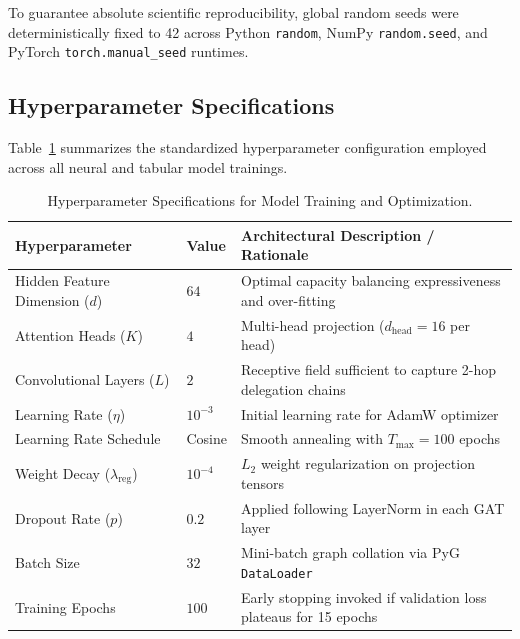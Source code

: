 To guarantee absolute scientific reproducibility, global random seeds were deterministically fixed to 42 across Python \texttt{random}, NumPy \texttt{random.seed}, and PyTorch \texttt{torch.manual\_seed} runtimes.

\subsection{Hyperparameter Specifications}
Table~\ref{tab:hyperparams} summarizes the standardized hyperparameter configuration employed across all neural and tabular model trainings.

\begin{table}[ht]
\centering
\small
\caption{Hyperparameter Specifications for Model Training and Optimization.}
\label{tab:hyperparams}
\begin{tabularx}{\textwidth}{llX}
\toprule
\textbf{Hyperparameter} & \textbf{Value} & \textbf{Architectural Description / Rationale} \\
\midrule
Hidden Feature Dimension ($d$) & $64$ & Optimal capacity balancing expressiveness and over-fitting \\
Attention Heads ($K$) & $4$ & Multi-head projection ($d_{\text{head}} = 16$ per head) \\
Convolutional Layers ($L$) & $2$ & Receptive field sufficient to capture 2-hop delegation chains \\
Learning Rate ($\eta$) & $10^{-3}$ & Initial learning rate for AdamW optimizer \\
Learning Rate Schedule & Cosine & Smooth annealing with $T_{\text{max}} = 100$ epochs \\
Weight Decay ($\lambda_{\text{reg}}$) & $10^{-4}$ & $L_2$ weight regularization on projection tensors \\
Dropout Rate ($p$) & $0.2$ & Applied following LayerNorm in each GAT layer \\
Batch Size & $32$ & Mini-batch graph collation via PyG \texttt{DataLoader} \\
Training Epochs & $100$ & Early stopping invoked if validation loss plateaus for 15 epochs \\
\bottomrule
\end{tabularx}
\end{table}


